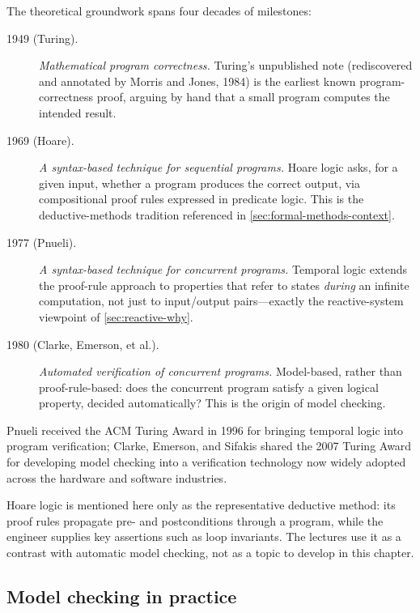 The theoretical groundwork spans four decades of milestones:

\begin{description}
  \item[1949 (Turing).] \emph{Mathematical program correctness.}  Turing's
        unpublished note (rediscovered and annotated by Morris and Jones,
        1984) is the earliest known program-correctness proof, arguing by
        hand that a small program computes the intended result.
  \item[1969 (Hoare).] \emph{A syntax-based technique for sequential
        programs.}  Hoare logic asks, for a given input, whether a program
        produces the correct output, via compositional proof rules
        expressed in predicate logic.  This is the deductive-methods
        tradition referenced in
        \cref{sec:formal-methods-context}.
  \item[1977 (Pnueli).] \emph{A syntax-based technique for concurrent
        programs.}  Temporal logic extends the proof-rule approach to
        properties that refer to states \emph{during} an infinite
        computation, not just to input/output pairs---exactly the
        reactive-system viewpoint of \cref{sec:reactive-why}.
  \item[1980 (Clarke, Emerson, et al.).] \emph{Automated verification of
        concurrent programs.}  Model-based, rather than proof-rule-based:
        does the concurrent program satisfy a given logical property,
        decided automatically?  This is the origin of model checking.
\end{description}

Pnueli received the ACM Turing Award in 1996 for bringing temporal logic
into program verification; Clarke, Emerson, and Sifakis shared the 2007
Turing Award for developing model checking into a verification technology
now widely adopted across the hardware and software industries.

Hoare logic is mentioned here only as the representative deductive method:
its proof rules propagate pre- and postconditions through a program, while
the engineer supplies key assertions such as loop invariants.  The lectures
use it as a contrast with automatic model checking, not as a topic to develop
in this chapter.

\subsection{Model checking in practice}

